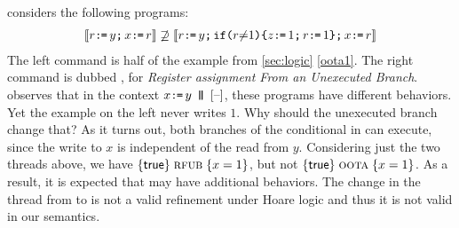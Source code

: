 \citet{BoehmOOTA} considers the following programs:
\begin{gather*}
  \llbracket r\texttt{:}\mkern-1mu\texttt{=}\, y\texttt{;}\,\allowbreak x\texttt{:}\mkern-1mu\texttt{=}\, r\rrbracket
  \not\supseteq
  \llbracket r\texttt{:}\mkern-1mu\texttt{=}\, y\texttt{;}\,\allowbreak \texttt{if}\allowbreak\texttt{(}r {\neq} 1\texttt{)} \allowbreak\texttt{\{} z\texttt{:}\mkern-1mu\texttt{=}\, 1\texttt{;}\,\allowbreak r\texttt{:}\mkern-1mu\texttt{=}\, 1\texttt{\}} \texttt{;}\,\allowbreak x\texttt{:}\mkern-1mu\texttt{=}\, r\rrbracket
\end{gather*}
The left command is half of the \oota{} example from
\textsection\ref{sec:logic} \eqref{oota1}.  The right command is dubbed \rfub{}, for
\emph{Register assignment From an Unexecuted Branch}.
\citeauthor{BoehmOOTA} observes that in the context $x\GETS y \PAR \hole{}$,
these programs have different behaviors.  Yet the \oota{} example on the left
never writes $1$.  Why should the unexecuted branch change that?  As it turns
out, both branches of the conditional in \rfub{} can execute, since the write
to $x$ is independent of the read from $y$.  Considering just the two threads
above, we have $\{\mathsf{true}\}\allowbreak\;\text{{\sc rfub}}\;\allowbreak\{x=1\}$, but not
$\{\mathsf{true}\}\allowbreak\;\text{{\sc oota}}\;\allowbreak\{x=1\}$.  As a result, it is expected that \rfub{}
may have additional behaviors.  The change in the thread from \oota{} to
\rfub{} is not a valid refinement under Hoare logic and thus it is not valid
in our semantics.
